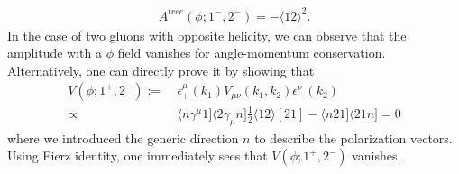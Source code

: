 \begin{align}
	A^{tree}(\phi;1^-,2^-)=-\langle 12 \rangle^2.	\label{phi2g}
\end{align}
In the case of two gluons with opposite helicity, we can observe that the amplitude with a $\phi$ field vanishes for angle-momentum conservation. Alternatively, one can directly prove it by showing that
\begin{align*}
	V(\phi;1^+,2^-):=&\ \epsilon_+^\mu(k_1) V_{\mu\nu}(k_1,k_2) \epsilon_-^\nu (k_2)\\
	\propto&\  \langle n\gamma^\mu 1] \langle 2 \gamma_\mu n] \tfrac{1}{2} \langle 12 \rangle [21]-\langle n 2 1]\langle 21n]=0
\end{align*}
where we introduced the generic direction $n$ to describe the polarization vectors. Using Fierz identity, one immediately sees that $V(\phi;1^+,2^-)$ vanishes.
